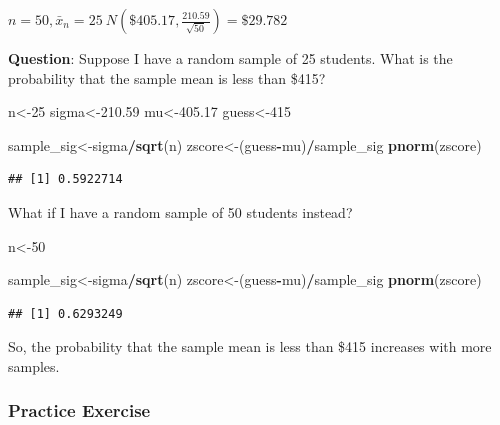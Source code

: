 \documentclass[
  openany]{book}
\newenvironment{Shaded}{\begin{snugshade}}{\end{snugshade}}
\newcommand{\DecValTok}[1]{\textcolor[rgb]{0.00,0.00,0.81}{#1}}
\newcommand{\FloatTok}[1]{\textcolor[rgb]{0.00,0.00,0.81}{#1}}
\newcommand{\FunctionTok}[1]{\textcolor[rgb]{0.13,0.29,0.53}{\textbf{#1}}}
\newcommand{\NormalTok}[1]{#1}
\newcommand{\OtherTok}[1]{\textcolor[rgb]{0.56,0.35,0.01}{#1}}
\newcommand{\SpecialCharTok}[1]{\textcolor[rgb]{0.81,0.36,0.00}{\textbf{#1}}}
\begin{document}
\(n=50, \bar{x}_n=25 ~ N(\$405.17,\frac{210.59}{\sqrt{50}}) = \$29.782\)

\textbf{Question}: Suppose I have a random sample of 25 students. What is the probability that the sample mean is less than \$415?

\begin{Shaded}
\begin{Highlighting}[]
\NormalTok{n}\OtherTok{\textless{}{-}}\DecValTok{25}
\NormalTok{sigma}\OtherTok{\textless{}{-}}\FloatTok{210.59}
\NormalTok{mu}\OtherTok{\textless{}{-}}\FloatTok{405.17}
\NormalTok{guess}\OtherTok{\textless{}{-}}\DecValTok{415}

\NormalTok{sample\_sig}\OtherTok{\textless{}{-}}\NormalTok{sigma}\SpecialCharTok{/}\FunctionTok{sqrt}\NormalTok{(n)}
\NormalTok{zscore}\OtherTok{\textless{}{-}}\NormalTok{(guess}\SpecialCharTok{{-}}\NormalTok{mu)}\SpecialCharTok{/}\NormalTok{sample\_sig}
\FunctionTok{pnorm}\NormalTok{(zscore)}
\end{Highlighting}
\end{Shaded}

\begin{verbatim}
## [1] 0.5922714
\end{verbatim}

What if I have a random sample of 50 students instead?

\begin{Shaded}
\begin{Highlighting}[]
\NormalTok{n}\OtherTok{\textless{}{-}}\DecValTok{50}

\NormalTok{sample\_sig}\OtherTok{\textless{}{-}}\NormalTok{sigma}\SpecialCharTok{/}\FunctionTok{sqrt}\NormalTok{(n)}
\NormalTok{zscore}\OtherTok{\textless{}{-}}\NormalTok{(guess}\SpecialCharTok{{-}}\NormalTok{mu)}\SpecialCharTok{/}\NormalTok{sample\_sig}
\FunctionTok{pnorm}\NormalTok{(zscore)}
\end{Highlighting}
\end{Shaded}

\begin{verbatim}
## [1] 0.6293249
\end{verbatim}

So, the probability that the sample mean is less than \$415 increases with more samples.

\subsubsection{Practice Exercise}\label{practice-exercise}
\end{document}
